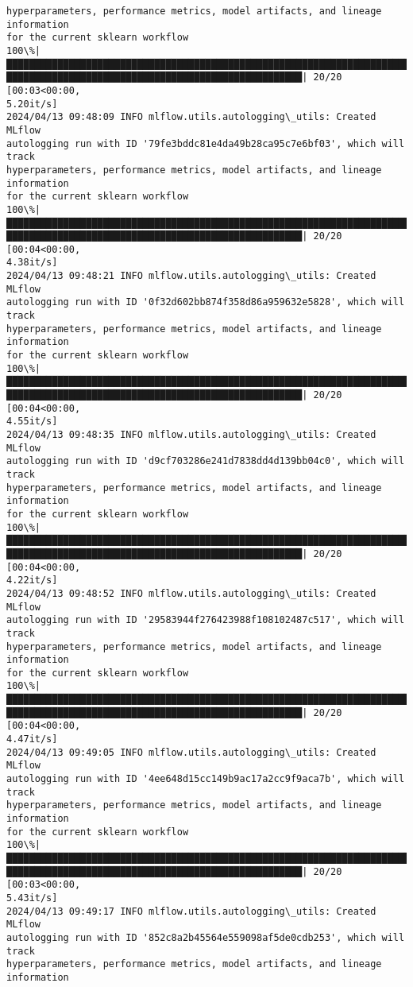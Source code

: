\documentclass[11pt]{article}
\begin{document}
\begin{Verbatim}[commandchars=\\\{\}]
hyperparameters, performance metrics, model artifacts, and lineage information
for the current sklearn workflow
100\%|███████████████████████████████████████████████████████████████████████████
████████████████████████████████████████████████████| 20/20 [00:03<00:00,
5.20it/s]
2024/04/13 09:48:09 INFO mlflow.utils.autologging\_utils: Created MLflow
autologging run with ID '79fe3bddc81e4da49b28ca95c7e6bf03', which will track
hyperparameters, performance metrics, model artifacts, and lineage information
for the current sklearn workflow
100\%|███████████████████████████████████████████████████████████████████████████
████████████████████████████████████████████████████| 20/20 [00:04<00:00,
4.38it/s]
2024/04/13 09:48:21 INFO mlflow.utils.autologging\_utils: Created MLflow
autologging run with ID '0f32d602bb874f358d86a959632e5828', which will track
hyperparameters, performance metrics, model artifacts, and lineage information
for the current sklearn workflow
100\%|███████████████████████████████████████████████████████████████████████████
████████████████████████████████████████████████████| 20/20 [00:04<00:00,
4.55it/s]
2024/04/13 09:48:35 INFO mlflow.utils.autologging\_utils: Created MLflow
autologging run with ID 'd9cf703286e241d7838dd4d139bb04c0', which will track
hyperparameters, performance metrics, model artifacts, and lineage information
for the current sklearn workflow
100\%|███████████████████████████████████████████████████████████████████████████
████████████████████████████████████████████████████| 20/20 [00:04<00:00,
4.22it/s]
2024/04/13 09:48:52 INFO mlflow.utils.autologging\_utils: Created MLflow
autologging run with ID '29583944f276423988f108102487c517', which will track
hyperparameters, performance metrics, model artifacts, and lineage information
for the current sklearn workflow
100\%|███████████████████████████████████████████████████████████████████████████
████████████████████████████████████████████████████| 20/20 [00:04<00:00,
4.47it/s]
2024/04/13 09:49:05 INFO mlflow.utils.autologging\_utils: Created MLflow
autologging run with ID '4ee648d15cc149b9ac17a2cc9f9aca7b', which will track
hyperparameters, performance metrics, model artifacts, and lineage information
for the current sklearn workflow
100\%|███████████████████████████████████████████████████████████████████████████
████████████████████████████████████████████████████| 20/20 [00:03<00:00,
5.43it/s]
2024/04/13 09:49:17 INFO mlflow.utils.autologging\_utils: Created MLflow
autologging run with ID '852c8a2b45564e559098af5de0cdb253', which will track
hyperparameters, performance metrics, model artifacts, and lineage information

\end{Verbatim}
\end{document}

